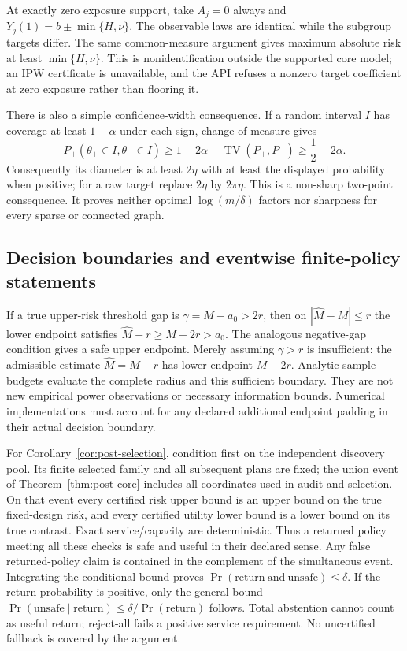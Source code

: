 At exactly zero exposure support, take $A_j=0$ always and
$Y_j(1)=b\pm\min\{H,\nu\}$. The observable laws are identical while the
subgroup targets differ. The same common-measure argument gives maximum
absolute risk at least $\min\{H,\nu\}$. This is nonidentification outside
the supported core model; an IPW certificate is unavailable, and the API
refuses a nonzero target coefficient at zero exposure rather than flooring it.

There is also a simple confidence-width consequence. If a random interval $I$
has coverage at least $1-\alpha$ under each sign, change of measure gives
\begin{equation}
 P_+(\theta_+\in I,\theta_-\in I)
 \geq 1-2\alpha-\operatorname{TV}(P_+,P_-)
 \geq\frac 12-2\alpha.
\end{equation}
Consequently its diameter is at least $2\eta$ with at least the displayed
probability when positive; for a raw target replace $2\eta$ by $2\pi\eta$.
This is a non-sharp two-point consequence. It proves neither optimal
$\log(m/\delta)$ factors nor sharpness for every sparse or connected graph.

\subsection{Decision boundaries and eventwise finite-policy statements}

If a true upper-risk threshold gap is $\gamma=M-a_0>2r$, then on
$|\widehat M-M|\leq r$ the lower endpoint satisfies
$\widehat M-r\geq M-2r>a_0$. The analogous negative-gap condition gives a
safe upper endpoint. Merely assuming $\gamma>r$ is insufficient: the admissible
estimate $\widehat M=M-r$ has lower endpoint $M-2r$.
Analytic sample budgets evaluate the complete radius and this sufficient
boundary. They are not new empirical power observations or necessary
information bounds. Numerical implementations must account for any declared
additional endpoint padding in their actual decision boundary.

For Corollary~\ref{cor:post-selection}, condition first on the independent
discovery pool. Its finite selected family and all subsequent plans are fixed;
the union event of Theorem~\ref{thm:post-core} includes all coordinates used in
audit and selection. On that event every certified risk upper bound is an upper
bound on the true fixed-design risk, and every certified utility lower bound
is a lower bound on its true contrast. Exact service/capacity are deterministic.
Thus a returned policy meeting all these checks is safe and useful in their
declared sense. Any false returned-policy claim is contained in the complement
of the simultaneous event. Integrating the conditional bound proves
$\Pr(\mathrm{return}\ \mathrm{and}\ \mathrm{unsafe})\leq\delta$.
If the return probability is positive, only the general bound
$\Pr(\mathrm{unsafe}\mid\mathrm{return})\leq
\delta/\Pr(\mathrm{return})$ follows. Total abstention cannot count as useful
return; reject-all fails a positive service requirement. No uncertified
fallback is covered by the argument.

